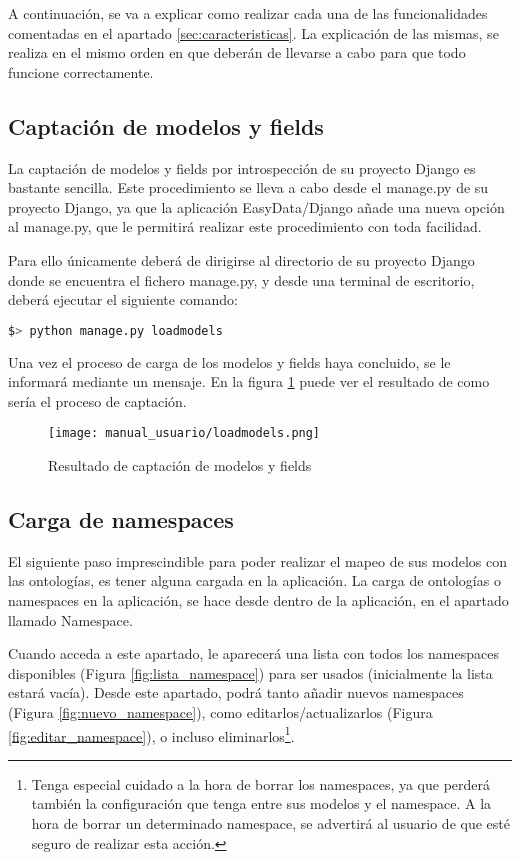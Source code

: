 A continuación, se va a explicar como realizar cada una de las funcionalidades
comentadas en el apartado \ref{sec:caracteristicas}. La explicación de las
mismas, se realiza en el mismo orden en que deberán de llevarse a cabo para que
todo funcione correctamente.

\subsection{Captación de modelos y fields}

La captación de modelos y fields por introspección de su proyecto Django es
bastante sencilla. Este procedimiento se lleva a cabo desde el manage.py de su
proyecto Django, ya que la aplicación EasyData/Django añade una nueva opción al
manage.py, que le permitirá realizar este procedimiento con toda facilidad.

Para ello únicamente deberá de dirigirse al directorio de su proyecto Django
donde se encuentra el fichero manage.py, y desde una terminal de escritorio,
deberá ejecutar el siguiente comando:

\begin{lstlisting}[frame=L, language=bash, basicstyle=\footnotesize]
$> python manage.py loadmodels
\end{lstlisting}

Una vez el proceso de carga de los modelos y fields haya concluido, se le
informará mediante un mensaje. En la figura \ref{fig:loadmodels} puede ver el
resultado de como sería el proceso de captación.

\begin{figure}[H]
    \begin{center}
        \texttt{[image: manual\_usuario/loadmodels.png]}
    \end{center}
    \caption{Resultado de captación de modelos y fields}
    \label{fig:loadmodels}
\end{figure}

\subsection{Carga de namespaces}

El siguiente paso imprescindible para poder realizar el mapeo de sus modelos con
las ontologías, es tener alguna cargada en la aplicación. La carga de ontologías
o namespaces en la aplicación, se hace desde dentro de la aplicación, en el
apartado llamado Namespace.

Cuando acceda a este apartado, le aparecerá una lista con todos los namespaces
disponibles (Figura \ref{fig:lista_namespace}) para ser usados (inicialmente la
lista estará vacía). Desde este apartado, podrá tanto añadir nuevos namespaces
(Figura \ref{fig:nuevo_namespace}), como editarlos/actualizarlos (Figura
\ref{fig:editar_namespace}), o incluso eliminarlos\footnote{Tenga especial
cuidado a la hora de borrar los namespaces, ya que perderá también la
configuración que tenga entre sus modelos y el namespace. A la hora de borrar un
determinado namespace, se advertirá al usuario de que esté seguro de realizar
esta acción.}.

